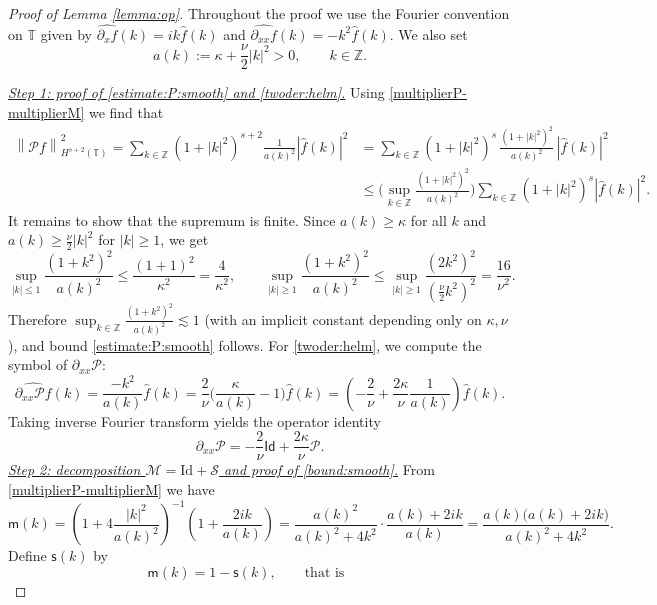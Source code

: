 \documentclass[reqno]{amsart}
\newcommand{\ZZ}{\mathbb Z}
\newcommand{\TT}{\mathbb T}
\newcommand{\Id}{\mathrm{Id}}
\newcommand{\norm}[1]{\left\lVert#1\right\rVert}
\theoremstyle{definition}
\numberwithin{equation}{section}
\numberwithin{theorem}{section}
\numberwithin{definition}{section}
\begin{document}
\begin{proof}[Proof of Lemma \ref{lemma:op}]
Throughout the proof we use the Fourier convention on $\TT$ given by
$\widehat{\partial_x f}(k)=ik\widehat f(k)$ and $\widehat{\partial_{xx} f}(k)=-k^2\widehat f(k)$.
We also set
\[
a(k):=\kappa+\frac{\nu}{2}|k|^2>0,\qquad k\in\ZZ .
\]

\medskip\noindent
\underline{\textit{Step 1: proof of \eqref{estimate:P:smooth} and \eqref{twoder:helm}.}}
Using \eqref{multiplierP-multiplierM} we find that
\begin{align*}
\norm{\mathcal{P}f}^{2}_{H^{s+2}(\mathbb{T})}
=\sum_{k\in\mathbb{Z}} \left(1+|k|^{2}\right)^{s+2}\frac{1}{a(k)^{2}}|\widehat{f}(k)|^{2}&=\sum_{k\in\mathbb{Z}} \left(1+|k|^{2}\right)^{s}\,
\frac{\left(1+|k|^{2}\right)^{2}}{a(k)^{2}}\,|\widehat{f}(k)|^{2}\\
&\le \Big(\sup_{k\in\mathbb{Z}}\frac{\left(1+|k|^{2}\right)^{2}}{a(k)^{2}}\Big)
\sum_{k\in\mathbb{Z}}\left(1+|k|^{2}\right)^{s} |\widehat{f}(k)|^{2}.
\end{align*}
It remains to show that the supremum is finite. Since $a(k)\ge \kappa$ for all $k$ and
$a(k)\ge \frac{\nu}{2}|k|^{2}$ for $|k|\ge 1$, we get
\[
\sup_{|k|\le 1}\frac{(1+k^{2})^{2}}{a(k)^2}\le \frac{(1+1)^2}{\kappa^2}=\frac{4}{\kappa^2},
\qquad
\sup_{|k|\ge 1}\frac{(1+k^{2})^{2}}{a(k)^2}
\le \sup_{|k|\ge 1}\frac{(2k^{2})^{2}}{\left(\frac{\nu}{2}k^{2}\right)^2}
=\frac{16}{\nu^{2}}.
\]
Therefore $\sup_{k\in\ZZ}\frac{(1+k^{2})^{2}}{a(k)^2}\lesssim 1$ (with an implicit constant depending only on
$\kappa,\nu$), and bound \eqref{estimate:P:smooth} follows. For \eqref{twoder:helm}, we compute the symbol of $\partial_{xx}\mathcal{P}$:
\[
\widehat{\partial_{xx}\mathcal{P} f}(k)=\frac{-k^{2}}{a(k)}\widehat{f}(k)=\frac{2}{\nu}\Big(\frac{\kappa}{a(k)}-1\Big)\widehat{f}(k)
=\left(-\frac{2}{\nu}+\frac{2\kappa}{\nu}\frac{1}{a(k)}\right)\widehat{f}(k).
\]
Taking inverse Fourier transform yields the operator identity
\[
\partial_{xx}\mathcal{P}
=-\frac{2}{\nu}\mathsf{Id}+\frac{2\kappa}{\nu}\mathcal{P}.
\]
\medskip\noindent
\underline{\textit{Step 2: decomposition $\mathcal{M}=\Id+\mathcal{S}$ and proof of \eqref{bound:smooth}.}}
From \eqref{multiplierP-multiplierM} we have
\[
\mathsf{m}(k)=\left(1 + 4 \frac{|k|^2}{a(k)^2} \right)^{-1}
\left(1 +  \frac{2 i k}{a(k)}\right)
=\frac{a(k)^2}{a(k)^2+4k^2}\cdot \frac{a(k)+2ik}{a(k)}
=\frac{a(k)\big(a(k)+2ik\big)}{a(k)^2+4k^2}.
\]
Define $\mathsf{s}(k)$ by
\begin{equation}\label{derivada:algo}
\mathsf{m}(k)=1-\mathsf{s}(k),
\qquad\text{that is}\qquad

\end{equation}
\end{proof}
\end{document}
